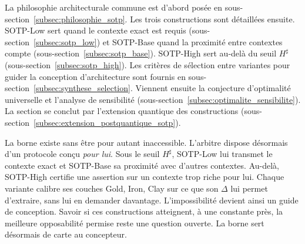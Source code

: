 \begin{sloppypar}
La philosophie architecturale
commune est d'abord pos\'ee en sous-section~\ref{subsec:philosophie_sotp}. Les trois
constructions sont d\'etaill\'ees ensuite. SOTP-Low sert quand le contexte exact est requis
(sous-section~\ref{subsec:sotp_low}) et SOTP-Base quand la proximit\'e entre contextes compte
(sous-section~\ref{subsec:sotp_base}). SOTP-High sert au-del\`a du seuil $H^\sharp$
(sous-section~\ref{subsec:sotp_high}). Les
crit\`eres de s\'election entre variantes pour guider la conception
d'architecture sont fournis en sous-section~\ref{subsec:synthese_selection}.
Viennent ensuite la conjecture d'optimalit\'e universelle et
l'analyse de sensibilit\'e (sous-section~\ref{subsec:optimalite_sensibilite}). La section
se conclut par l'extension quantique des constructions
(sous-section~\ref{subsec:extension_postquantique_sotp}).
\end{sloppypar}

\begin{boiteArbitre}
La borne existe sans \^etre pour autant inaccessible. L'arbitre dispose
d\'esormais d'un protocole con\c{c}u \emph{pour lui}. Sous le seuil $H^\sharp$, SOTP-Low lui
transmet le contexte exact et SOTP-Base sa proximit\'e avec d'autres contextes.
Au-del\`a, SOTP-High certifie une assertion sur un contexte trop riche pour lui. Chaque variante calibre ses couches Gold,
Iron, Clay sur ce que son $\Delta$ lui permet d'extraire,
sans lui en demander davantage. L'impossibilit\'e devient ainsi un guide de
conception. Savoir si ces constructions atteignent, \`a une constante pr\`es, la meilleure
opposabilit\'e permise reste une question ouverte. La borne sert d\'esormais de carte au concepteur.
\end{boiteArbitre}

